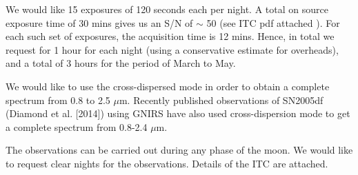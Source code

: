 \documentclass[11pt]{article}
\begin{document}
%

\technicaldescription    %
We would like 15 exposures of 120 seconds  each per night. A total on source exposure time of 30 mins gives us an S/N of $\sim$ 50 (see ITC pdf attached ). For each such set of  exposures, the acquisition time is 12 mins. 
Hence, in total we request for 1 hour for each night (using a conservative estimate for overheads), and a total of 3 hours for the period of March to May. 

We would like to use the cross-dispersed mode in order to obtain a complete spectrum from 0.8 to 2.5 $\mu$m. Recently published observations of SN2005df (Diamond et al. [2014]) using GNIRS have also used cross-dispersion mode to get a complete spectrum from 0.8-2.4 $\mu$m.

The observations can be carried out during any phase of the moon. We would like to request clear nights for the observations. Details of the ITC are attached. 
\bigskip


\end{document}
